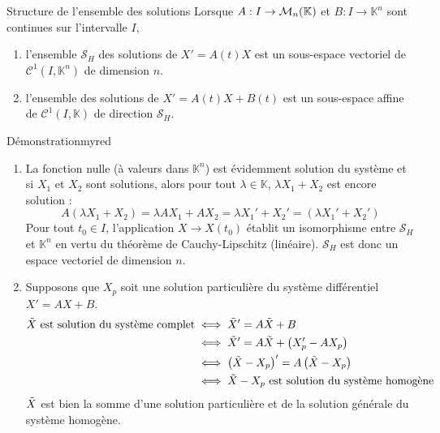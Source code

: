     \begin{theo}{Structure de l’ensemble des solutions}{}
        Lorsque $A: I \rightarrow \mathcal{M}_{n}(\mathbb{K})$ et $B : I \rightarrow \mathbb{K}^n$ sont continues sur l’intervalle $I$,
        \begin{enumerate}
            \item l’ensemble $\mathcal{S}_H$ des solutions de $X' = A(t)X$ est un sous-espace vectoriel de $\mathcal{C}^1(I,\mathbb{K}^n)$ de dimension $n$.
            \item l’ensemble des solutions de $X' = A(t)X + B(t)$ est un sous-espace affine de $\mathcal{C}^1(I,\mathbb{K})$ de direction $\mathcal{S}_H$.
        \end{enumerate}
    \end{theo}

    \begin{demo}{Démonstration}{myred}
        \begin{enumerate}
            \item La fonction nulle (à valeurs dans $\mathbb{K}^n$) est évidemment solution du système et si $X_1$ et $X_2$ sont solutions, alors pour tout $\lambda \in \mathbb{K}$, $\lambda X_1 + X_2$ est encore solution : 
            \[ A(\lambda X_1 + X_2) = \lambda A X_1 + A X_2 = \lambda X_1' + X_2' = \left(\lambda X_1' + X_2'\right) \] 
            Pour tout $t_0 \in I$, l’application $X \rightarrow X(t_0)$ établit un isomorphisme entre $\mathcal{S}_H$ et $\mathbb{K}^n$ en vertu du théorème de Cauchy-Lipschitz (linéaire). $\mathcal{S}_H$ est donc un espace vectoriel de dimension $n$.
            \item Supposons que $X_p$ soit une solution particulière du système différentiel $X' = AX + B$.
            \begin{align*}
                \Tilde{X} \text{ est solution du système complet} &\iff \Tilde{X}' = A \Tilde{X} + B \\
                &\iff \Tilde{X}' = A \Tilde{X} + \left(X_p' - AX_p\right) \\
                &\iff \left(\Tilde{X} - X_p\right)' = A \left(\Tilde{X} - X_p\right) \\
                &\iff \Tilde{X} - X_p \text{ est solution du système homogène} 
            \end{align*}
            $\Tilde{X}$ est bien la somme d’une solution particulière et de la solution générale du système homogène.
        \end{enumerate}
    \end{demo}

